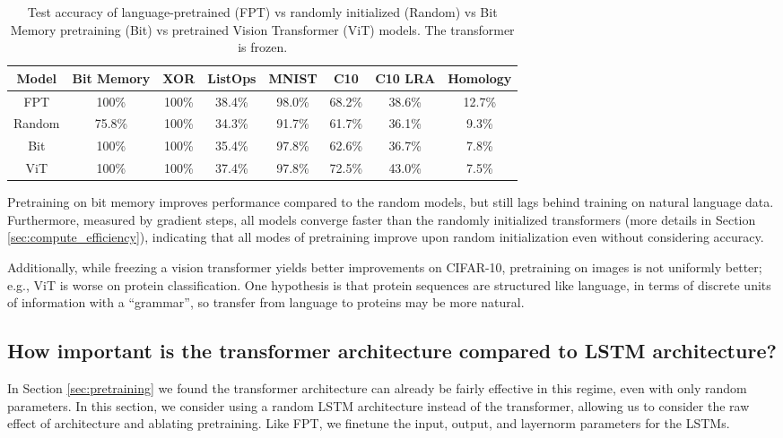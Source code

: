 \begin{table}[h] 
\begin{center}
\begin{tabular}{c|ccccccc}
\toprule
\textbf{Model} & \multicolumn{1}{c}{\bf Bit Memory} & \multicolumn{1}{c}{\bf XOR} & \multicolumn{1}{c}{\bf ListOps} & \multicolumn{1}{c}{\bf MNIST} & \multicolumn{1}{c}{\bf C10} & \multicolumn{1}{c}{\bf C10 LRA} & \multicolumn{1}{c}{\bf Homology} \\
\midrule
FPT & 100\% & 100\% & 38.4\% & 98.0\% & 68.2\% & 38.6\% & 12.7\% \\
Random & 75.8\% & 100\% & 34.3\% & 91.7\% & 61.7\% & 36.1\% & 9.3\% \\
Bit & 100\% & 100\% & 35.4\% & 97.8\% & 62.6\% & 36.7\% & 7.8\% \\
ViT & 100\% & 100\% & 37.4\% & 97.8\% & 72.5\% & 43.0\% & 7.5\% \\
\bottomrule
\end{tabular}
\end{center}
\caption{
Test accuracy of language-pretrained (FPT) vs randomly initialized (Random) vs Bit Memory pretraining (Bit) vs pretrained Vision Transformer (ViT) models.
The transformer is frozen.
}\label{table:random}
\end{table}

Pretraining on bit memory improves performance compared to the random models, but still lags behind training on natural language data.
Furthermore, measured by gradient steps, all models converge faster than the randomly initialized transformers (more details in Section \ref{sec:compute_efficiency}), indicating that all modes of pretraining improve upon random initialization even without considering accuracy.

Additionally, while freezing a vision transformer yields better improvements on CIFAR-10, pretraining on images is not uniformly better; e.g., ViT is worse on protein classification.
One hypothesis is that protein sequences are structured like language, in terms of discrete units of information with a ``grammar'', so transfer from language to proteins may be more natural.
\vspace{2em}

\subsection{How important is the transformer architecture compared to LSTM architecture?}
\label{sec:architecture_results}

In Section \ref{sec:pretraining} we found the transformer architecture can already be fairly effective in this regime, even with only random parameters.
In this section, we consider using a random LSTM architecture instead of the transformer, allowing us to consider the raw effect of architecture and ablating pretraining.
Like FPT, we finetune the input, output, and layernorm parameters for the LSTMs.

